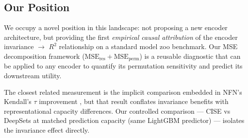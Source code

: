 \subsection{Our Position}

We occupy a novel position in this landscape: not proposing a new encoder architecture, but providing the first \emph{empirical causal attribution} of the encoder invariance $\to$ $R^2$ relationship on a standard model zoo benchmark. Our MSE decomposition framework ($\text{MSE}_\text{res} + \text{MSE}_\text{perm}$) is a reusable diagnostic that can be applied to any encoder to quantify its permutation sensitivity and predict its downstream utility.

The closest related measurement is the implicit comparison embedded in NFN's Kendall's $\tau$ improvement \cite{Zhou2023Permutation}, but that result conflates invariance benefits with representational capacity differences. Our controlled comparison --- CISE vs DeepSets at matched prediction capacity (same LightGBM predictor) --- isolates the invariance effect directly.
